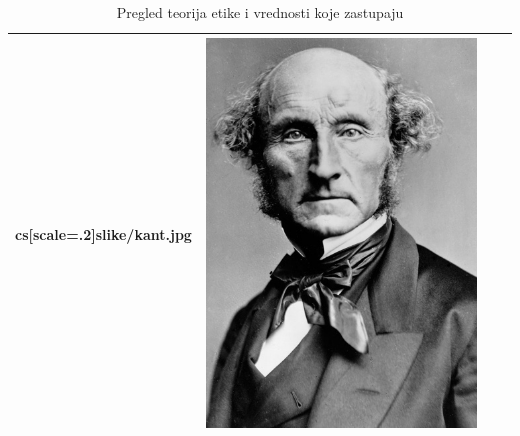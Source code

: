\documentclass[a4paper]{article}
\begin{document}
\begin{table}
\begin{center}
\begin{tabular}{|l|c|c|c|}
cs[scale=.2]{slike/kant.jpg} & \includegraphics[scale=.2]{slike/mil.jpg} \\
\hline
\end{tabular}
\label{tab:tabela1}
\caption{Pregled teorija etike i vrednosti koje zastupaju}
\end{center}
\end{table}
\end{document}
